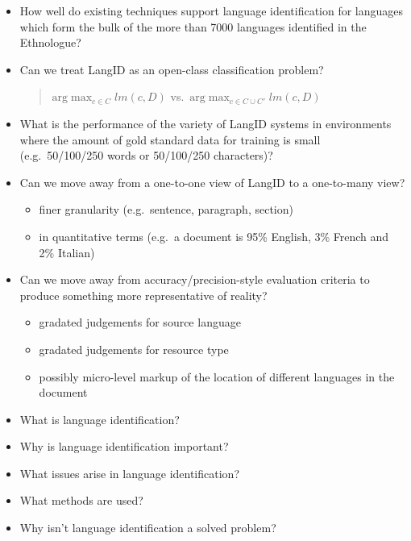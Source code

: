 \documentclass[a4paper,landscape,headrule,footrule,xetex]{foils}
\begin{document}
\begin{itemize}
\item How well do existing techniques support language identification
  for languages which form the bulk of the more than 7000 languages
  identified in the Ethnologue?
\item Can we treat LangID as an open-class classification problem?
  \begin{quote}
    $\mathrm{arg} \max_{c\in C} lm(c,D)$ vs.\ $\mathrm{arg} \max_{c\in
      C\cup C'} lm(c,D)$
  \end{quote}
\item What is the performance of the variety of LangID systems in
  environments where the amount of gold standard data for training is
  small (e.g.\ 50/100/250 words or 50/100/250 characters)?
\item Can we move away from a one-to-one view of LangID to a
  one-to-many view?
  \begin{itemize}
  \item finer granularity (e.g.\ sentence, paragraph, section)
  \item in quantitative terms (e.g.\ a document is 95\% English, 3\%
    French and 2\% Italian)
  \end{itemize}
\item Can we move away from accuracy/precision-style evaluation criteria to produce
  something more representative of reality?
  \begin{itemize}
  \item gradated judgements for source language
  \item gradated judgements for resource type
  \item possibly micro-level markup of the location of different
    languages in the document
  \end{itemize}
\end{itemize}









\MyLogo

\begin{itemize}
\item What is language identification?
\item Why is language identification important?
\item What issues arise in language identification?
\item What methods are used?
\item Why isn't language identification a solved problem?
\end{itemize}
\end{document}
